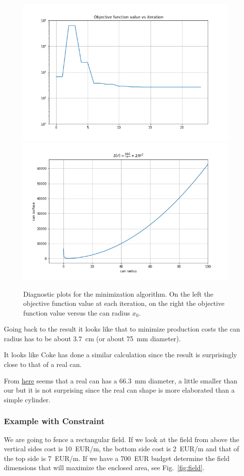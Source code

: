 \begin{figure}[htb]
	\centering
	\includegraphics[width=0.45\linewidth]{figures/objective_function_value}
	\includegraphics[width=0.45\linewidth]{figures/can_surface}
	\caption{Diagnostic plots for the minimization algorithm. On the left the objective function value at each iteration, on the right the objective function value versus the can radius $x_0$.}
	\label{fig:minimization_diagnostic}
\end{figure}

Going back to the result it looks like that to minimize production costs the can radius has to be about 3.7~cm (or about 75~mm diameter).

\begin{curiosity}
It looks like Coke has done a similar calculation since the result is surprisingly close to that of a real can. 

From \href{	https://www.ball.com/eu/solutions/markets-capabilities/capabilities/beverage-cans/standard-range
}{here} seems that a real can has a 66.3~mm diameter, a little smaller than our but it is not surprising since the real can shape is more elaborated than a simple cylinder.
\end{curiosity}

\subsubsection{Example with Constraint}
\label{example-with-constraint}

We are going to fence a rectangular field. If we look at the field from above the vertical sides cost is 10~EUR/m, the bottom side cost is 2~EUR/m and that of the top side is 7~EUR/m. If we have a 700~EUR budget determine
the field dimensions that will maximize the enclosed area, see Fig.~\ref{fig:field}.

